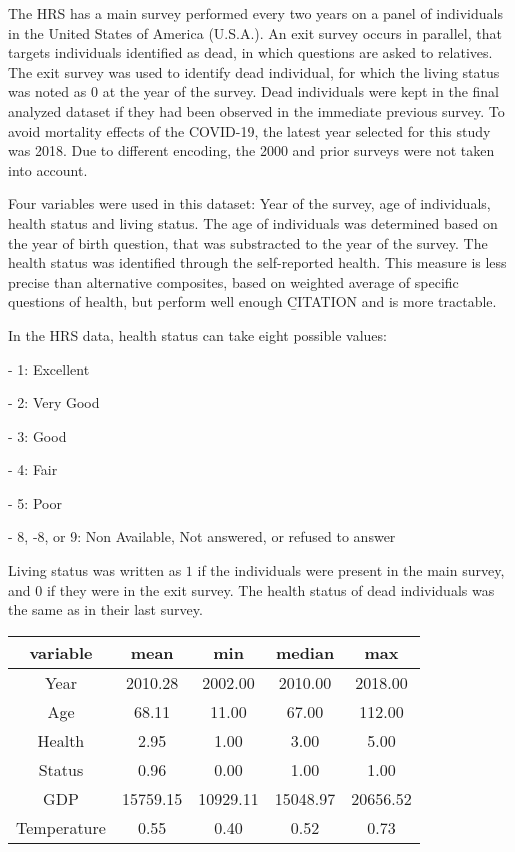 \documentclass{article}
\begin{document}
The HRS has a main survey performed every two years on a panel of individuals in the United States of America (U.S.A.). 
An exit survey occurs in parallel, that targets individuals identified as dead, in which questions are asked to relatives.
The exit survey was used to identify dead individual, for which the living status was noted as $0$ at the year of the survey. 
Dead individuals were kept in the final analyzed dataset if they had been observed in the immediate previous survey. 
To avoid mortality effects of the COVID-19, the latest year selected for this study was 2018.
Due to different encoding, the 2000 and prior surveys were not taken into account. 

Four variables were used in this dataset: Year of the survey, age of individuals, health status and living status.
The age of individuals was determined based on the year of birth question, that was substracted to the year of the survey. 
The health status was identified through the self-reported health.
This measure is less precise than alternative composites, based on weighted average of specific questions of health, 
but perform well enough \b{CITATION} and is more tractable.

In the HRS data, health status can take eight possible values: 



- 1: Excellent

- 2: Very Good

- 3: Good

- 4: Fair

- 5: Poor

- 8, -8, or 9: Non Available, Not answered, or refused to answer



Living status was written as $1$ if the individuals were present in the main survey, and $0$ if they were in the exit survey.
The health status of dead individuals was the same as in their last survey. 

\begin{tabular}{ccccc}
    \toprule
    variable & mean & min & median & max\\
    \midrule
    Year & 2010.28 & 2002.00 & 2010.00 & 2018.00\\
    Age & 68.11 & 11.00 & 67.00 & 112.00\\
    Health & 2.95 & 1.00 & 3.00 & 5.00\\
    Status & 0.96 & 0.00 & 1.00 & 1.00\\
    GDP & 15759.15 & 10929.11 & 15048.97 & 20656.52\\
    Temperature & 0.55 & 0.40 & 0.52 & 0.73\\
    \bottomrule
\end{tabular}
    
\end{document}
